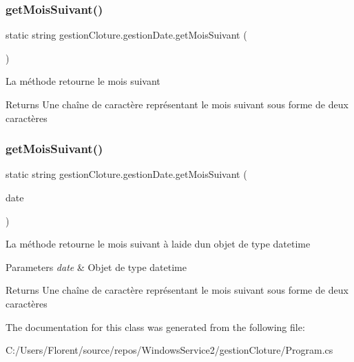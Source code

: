 \subsubsection{\texorpdfstring{get\+Mois\+Suivant()}{getMoisSuivant()}\hspace{0.1cm}{\footnotesize\ttfamily [1/2]}}
{\footnotesize\ttfamily static string gestion\+Cloture.\+gestion\+Date.\+get\+Mois\+Suivant (\begin{DoxyParamCaption}{ }\end{DoxyParamCaption})\hspace{0.3cm}{\ttfamily [static]}}



La méthode retourne le mois suivant 

\begin{DoxyReturn}{Returns}
Une chaîne de caractère représentant le mois suivant sous forme de deux caractères
\end{DoxyReturn}
\mbox{\label{classgestion_cloture_1_1gestion_date_abb6535d1c83722cb363400786129d6da}} 
\subsubsection{\texorpdfstring{get\+Mois\+Suivant()}{getMoisSuivant()}\hspace{0.1cm}{\footnotesize\ttfamily [2/2]}}
{\footnotesize\ttfamily static string gestion\+Cloture.\+gestion\+Date.\+get\+Mois\+Suivant (\begin{DoxyParamCaption}\item[{Date\+Time}]{date }\end{DoxyParamCaption})\hspace{0.3cm}{\ttfamily [static]}}



La méthode retourne le mois suivant à l\textquotesingle{}aide d\textquotesingle{}un objet de type datetime 


\begin{DoxyParams}{Parameters}
{\em date} & Objet de type datetime\\
\hline
\end{DoxyParams}
\begin{DoxyReturn}{Returns}
Une chaîne de caractère représentant le mois suivant sous forme de deux caractères
\end{DoxyReturn}


The documentation for this class was generated from the following file\+:\begin{DoxyCompactItemize}
\item 
C\+:/\+Users/\+Florent/source/repos/\+Windows\+Service2/gestion\+Cloture/Program.\+cs\end{DoxyCompactItemize}
